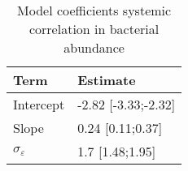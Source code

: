\begin{table}

\caption{\label{tab:}Model coefficients systemic correlation in bacterial abundance}
\centering
\begin{tabular}[t]{ll}
\toprule
Term & Estimate\\
\midrule
Intercept & -2.82 [-3.33;-2.32]\\
Slope & 0.24 [0.11;0.37]\\
$\sigma_{\varepsilon}$ & 1.7 [1.48;1.95]\\
\bottomrule
\end{tabular}
\end{table}